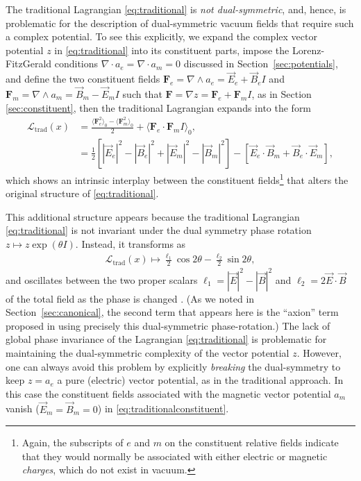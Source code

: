 \documentclass[1p,sort&compress]{elsarticle}
\numberwithin{equation}{section}
\newcommand{\rv}[1]{\vec{#1}}
\newcommand{\bv}[1]{\mathbf{#1}}
\newcommand{\mean}[1]{\langle #1 \rangle}
\begin{document}
The traditional Lagrangian \eqref{eq:traditional}  is \emph{not dual-symmetric}, and, hence, is problematic for the description of dual-symmetric vacuum fields that require such a complex potential.  To see this explicitly, we expand the complex vector potential $z$ in \eqref{eq:traditional} into its constituent parts, impose the Lorenz-FitzGerald conditions $\nabla \cdot a_e = \nabla \cdot a_m = 0$ discussed in Section~\ref{sec:potentials}, and define the two constituent fields $\bv{F}_e = \nabla\wedge a_e = \rv{E}_e + \rv{B}_e I$ and $\bv{F}_m = \nabla\wedge a_m = \rv{B}_m - \rv{E}_m I$ such that $\bv{F} = \nabla z = \bv{F}_e + \bv{F}_m I$, as in Section \ref{sec:constituent}, then the traditional Lagrangian expands into the form
\begin{align}\label{eq:traditionalconstituent}
  \mathcal{L}_{\text{trad}}(x) &= \frac{\mean{\bv{F}_e^2}_0 - \mean{\bv{F}_m^2}_0}{2} + \mean{\bv{F}_e\cdot\bv{F}_m I}_0, \\
  &= \frac{1}{2}[|\rv{E}_e|^2 - |\rv{B}_e|^2 + |\rv{E}_m|^2 - |\rv{B}_m|^2] - [\rv{E}_e\cdot\rv{B}_m + \rv{B}_e\cdot\rv{E}_m], \nonumber
\end{align}
which shows an intrinsic interplay between the constituent fields\footnote{Again, the subscripts of $e$ and $m$ on the constituent relative fields indicate that they would normally be associated with either electric or magnetic \emph{charges}, which do not exist in vacuum.} that alters the original structure of \eqref{eq:traditional}.

This additional structure appears because the traditional Lagrangian \eqref{eq:traditional} is not invariant under the dual symmetry phase rotation $z\mapsto z\exp(\theta I)$.  Instead, it transforms as 
\begin{align}
  \mathcal{L}_{\text{trad}}(x) \mapsto \frac{\ell_1}{2}\cos2\theta - \frac{\ell_2}{2}\sin2\theta,
\end{align}
and oscillates between the two proper scalars $\ell_1 = |\rv{E}|^2 - |\rv{B}|^2$ and $\ell_2 = 2\rv{E}\cdot\rv{B}$ of the total field as the phase is changed \cite{Bliokh2013}.  (As we noted in Section~\ref{sec:canonical}, the second term that appears here is the ``axion'' term proposed in \cite{Weinberg1978} using precisely this dual-symmetric phase-rotation.)  The lack of global phase invariance of the Lagrangian \eqref{eq:traditional} is problematic for maintaining the dual-symmetric complexity of the vector potential $z$.  However, one can always avoid this problem by explicitly \emph{breaking} the dual-symmetry to keep $z = a_e$ a pure (electric) vector potential, as in the traditional approach.  In this case the constituent fields associated with the magnetic vector potential $a_m$ vanish ($\rv{E}_m = \rv{B}_m = 0$) in \eqref{eq:traditionalconstituent}.
\end{document}
